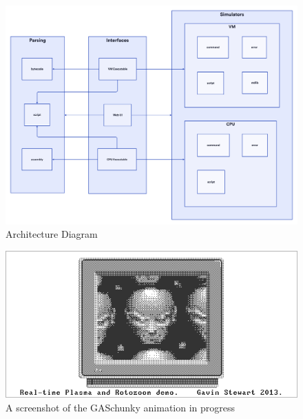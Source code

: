 \begin{center}
  \begin{figure}[h]
    \includegraphics[width=16cm]{fig/architecture.png}
    \caption{Architecture Diagram}%
    \label{fig:arch}
  \end{figure}
\end{center}

\begin{center}
  \begin{figure}[h]
    \includegraphics[width=16cm]{fig/gaschunky.png}
    \caption{A screenshot of the GASchunky animation in progress}%
    \label{fig:gaschunky-screenshot}
  \end{figure}
\end{center}

